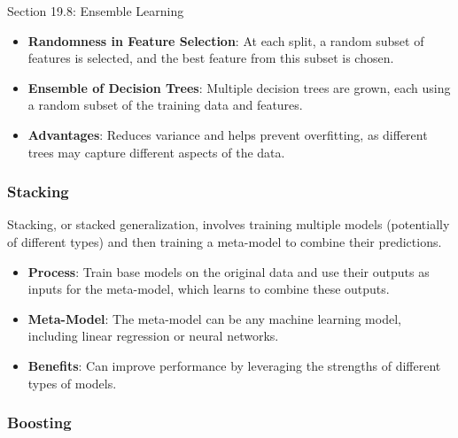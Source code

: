 \begin{notes}{Section 19.8: Ensemble Learning}
    \begin{highlight}
    
        \begin{itemize}
            \item \textbf{Randomness in Feature Selection}: At each split, a random subset of features is selected, and the best feature from this subset is chosen.
            \item \textbf{Ensemble of Decision Trees}: Multiple decision trees are grown, each using a random subset of the training data and features.
            \item \textbf{Advantages}: Reduces variance and helps prevent overfitting, as different trees may capture different aspects of the data.
        \end{itemize}
    
    \end{highlight}
    
    \subsubsection*{Stacking}
    
    Stacking, or stacked generalization, involves training multiple models (potentially of different types) and then training a meta-model to combine their predictions.
    
    \begin{highlight}[Stacking]
    
        \begin{itemize}
            \item \textbf{Process}: Train base models on the original data and use their outputs as inputs for the meta-model, which learns to combine these outputs.
            \item \textbf{Meta-Model}: The meta-model can be any machine learning model, including linear regression or neural networks.
            \item \textbf{Benefits}: Can improve performance by leveraging the strengths of different types of models.
        \end{itemize}
    
    \end{highlight}
    
    \subsubsection*{Boosting}
    

\end{notes}
